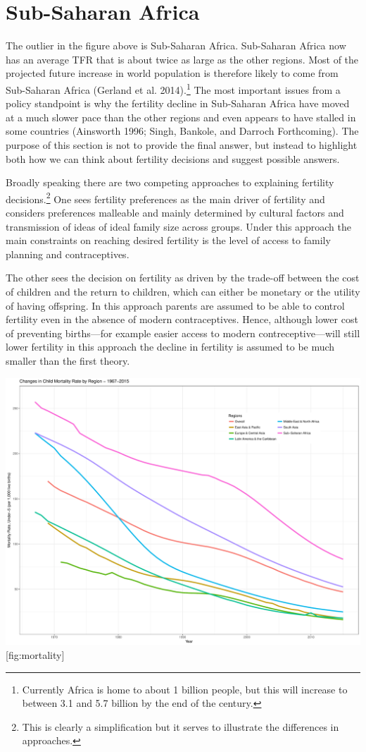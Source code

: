 \documentclass[]{article}
\begin{document}
\section{Sub-Saharan Africa}\label{sub-saharan-africa}

The outlier in the figure above is Sub-Saharan Africa. Sub-Saharan Africa now has an average TFR that is about twice as large as the other regions. Most of the projected future increase in world population is therefore likely to come from Sub-Saharan Africa (Gerland et al. 2014).\footnote{Currently Africa is home to about 1 billion people, but this will increase to between 3.1 and 5.7 billion by the end of the century.} The most important issues from a policy standpoint is why the fertility decline in Sub-Saharan Africa have moved at a much slower pace than the other regions and even appears to have stalled in some countries (Ainsworth 1996; Singh, Bankole, and Darroch Forthcoming). The purpose of this section is not to provide the final answer, but instead to highlight both how we can think about fertility decisions and suggest possible answers.

Broadly speaking there are two competing approaches to explaining fertility decisions.\footnote{This is clearly a simplification but it serves to illustrate the differences in approaches.} One sees fertility preferences as the main driver of fertility and considers preferences malleable and mainly determined by cultural factors and transmission of ideas of ideal family size across groups. Under this approach the main constraints on reaching desired fertility is the level of access to family planning and contraceptives.

The other sees the decision on fertility as driven by the trade-off between the cost of children and the return to children, which can either be monetary or the utility of having offspring. In this approach parents are assumed to be able to control fertility even in the absence of modern contraceptives. Hence, although lower cost of preventing births---for example easier access to modern contreceptive---will still lower fertility in this approach the decline in fertility is assumed to be much smaller than the first theory.

\includegraphics{../figures/childMortalityRates.pdf} {[}fig:mortality{]}
\end{document}

